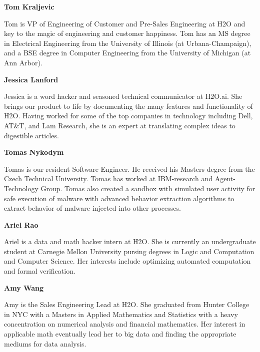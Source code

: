 \textbf{Tom Kraljevic}

Tom is VP of Engineering of Customer and Pre-Sales Engineering at H2O and key to the magic of engineering and customer happiness. Tom has an MS degree in Electrical Engineering from the University of Illinois (at Urbana-Champaign), and a BSE degree in Computer Engineering from the University of Michigan (at Ann Arbor).

\textbf{Jessica Lanford}

Jessica is a word hacker and seasoned technical communicator at H2O.ai. She brings our product to life by documenting the many features and functionality of H2O. Having worked for some of the top companies in technology including Dell, AT$\&$T, and Lam Research, she is an expert at translating complex ideas to digestible articles.

\textbf{Tomas Nykodym}

Tomas is our resident Software Engineer. He received his Masters degree from the Czech Technical University. Tomas has worked at IBM-research and Agent-Technology Group. Tomas also created a sandbox with simulated user activity for safe execution of malware with advanced behavior extraction algorithms to extract behavior of malware injected into other processes. 

\textbf{Ariel Rao}

Ariel is a data and math hacker intern at H2O. She is currently an undergraduate student at Carnegie Mellon University pursing degrees in Logic and Computation and Computer Science. Her interests include optimizing automated computation and formal verification.

\textbf{Amy Wang}

Amy is the Sales Engineering Lead at H2O. She graduated from Hunter College in NYC with a Masters in Applied Mathematics and Statistics with a heavy concentration on numerical analysis and financial mathematics. Her interest in applicable math eventually lead her to big data and finding the appropriate mediums for data analysis.



